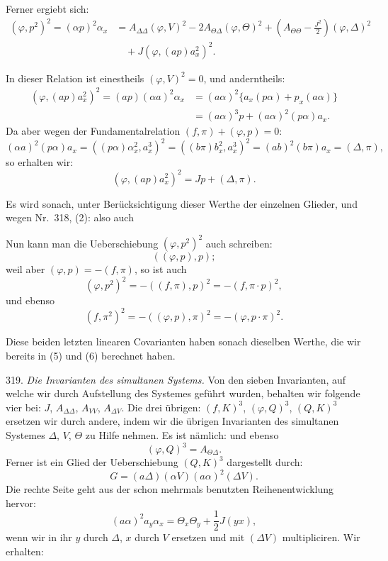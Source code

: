 Ferner ergiebt sich:
\[
\begin{aligned}
(\varphi, p^2)^2 = (\alpha p)^2\alpha_x &= A_{\Delta\Delta}(\varphi,V)^2 - 2A_{\Theta\Delta}(\varphi,\Theta)^2 + \left(A_{\Theta\Theta} - \frac{J^2}{2}\right)(\varphi,\Delta)^2\\
&\quad + J(\varphi, (ap)a_x^2)^2.
\end{aligned}
\]


In dieser Relation ist einestheils $(\varphi, V)^2 = 0$, und anderntheils:
\[
\begin{aligned}
(\varphi, (ap)a_x^2)^2 = (ap)(\alpha a)^2\alpha_x &= (a\alpha)^2\{a_x(p\alpha) + p_x(a\alpha)\}\\
&= (a\alpha)^3p + (a\alpha)^2(p\alpha)a_x.
\end{aligned}
\]
Da aber wegen der Fundamentalrelation $(f, \pi) + (\varphi, p) = 0$:
\[
(\alpha a)^2(p\alpha)a_x = ((p\alpha)\alpha_x^2, a_x^3)^2 = ((b\pi)b_x^2, a_x^3)^2 = (ab)^2(b\pi)a_x = (\Delta,\pi),
\]
so erhalten wir:
\[
(\varphi, (ap)a_x^2)^2 = Jp + (\Delta,\pi).
\]

Es wird sonach, unter Berücksichtigung dieser Werthe der einzelnen Glieder,
und wegen Nr.\ 318, (2):
also auch

Nun kann man die Ueberschiebung $(\varphi, p^2)^2$ auch schreiben:
\[
((\varphi, p), p);
\]
weil aber $(\varphi, p) = -(f, \pi)$, so ist auch
\[
(\varphi, p^2)^2 = -((f, \pi), p)^2 = -(f, \pi\cdot p)^2,
\]
und ebenso
\[
(f, \pi^2)^2 = -((\varphi, p), \pi)^2 = -(\varphi, p\cdot\pi)^2.
\]

Diese beiden letzten linearen Covarianten haben sonach dieselben Werthe,
die wir bereits in (5) und (6) berechnet haben.

319. \textit{Die Invarianten des simultanen Systems.} Von den sieben
Invarianten, auf welche wir durch Aufstellung des Systemes geführt wurden,
behalten wir folgende vier bei: $J$, $A_{\Delta\Delta}$, $A_{VV}$,
$A_{\Delta V}$. Die drei übrigen: $(f, K)^3$, $(\varphi, Q)^3$, $(Q, K)^3$
ersetzen wir durch andere, indem wir die übrigen Invarianten des
simultanen Systemes $\Delta$, $V$, $\Theta$ zu Hilfe nehmen. Es ist
nämlich:
und ebenso
\[
(\varphi, Q)^3 = A_{\Theta\Delta}.
\]
Ferner ist ein Glied der Ueberschiebung $(Q, K)^3$ dargestellt durch:
\[
G = (a\Delta)(\alpha V)(a\alpha)^2(\Delta V).
\]
Die rechte Seite geht aus der schon mehrmals benutzten
Reihenentwicklung hervor:
\[
(a\alpha)^2a_y\alpha_x = \Theta_x\Theta_y + \frac{1}{2}J(yx),
\]
wenn wir in ihr $y$ durch $\Delta$, $x$ durch $V$ ersetzen und mit
$(\Delta V)$ multipliciren. Wir erhalten:


